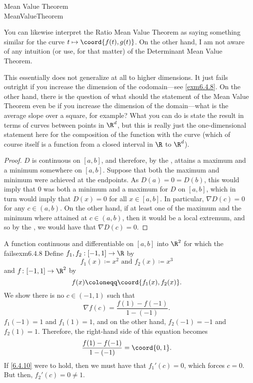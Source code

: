 \begin{thm}{Mean Value Theorem \\}{MeanValueTheorem}
\begin{rmk}
You can likewise interpret the Ratio Mean Value Theorem as saying something similar for the curve $t\mapsto \coord{f(t),g(t)}$.  On the other hand, I am not aware of any intuition (or use, for that matter) of the Determinant Mean Value Theorem.
\end{rmk}
\begin{rmk}
This essentially does not generalize at all to higher dimensions.  It just fails outright if you increase the dimension of the codomain---see \cref{exm6.4.8}.  On the other hand, there is the question of what should the statement of the Mean Value Theorem even be if you increase the dimension of the domain---what is the average slope over a square, for example?  What you can do is state the result in terms of curves between points in $\R ^d$, but this is really just the one-dimensional statement here for the composition of the function with the curve (which of course itself is a function from a closed interval in $\R$ to $\R ^d$).
\end{rmk}
\begin{proof}
$D$ is continuous on $[a,b]$, and therefore, by the , attains a maximum and a minimum somewhere on $[a,b]$.  Suppose that both the maximum and minimum were achieved at the endpoints.  As $D(a)=0=D(b)$, this would imply that $0$ was both a minimum and a maximum for $D$ on $[a,b]$, which in turn would imply that $D (x)=0$ for all $x\in [a,b]$.  In particular, $\nabla D(c)=0$ for any $c\in (a,b)$.  On the other hand, if at least one of the maximum and the minimum where attained at $c\in (a,b)$, then it would be a local extremum, and so by the , we would have that $\nabla D(c)=0$.
\end{proof}
\end{thm}

\begin{exm}{A function continuous and differentiable on ${[a,b]}$ into $\R ^2$ for which the  fails}{exm6.4.8}
Define $f_1,f_2:[-1,1]\rightarrow \R$ by
\begin{equation}
f_1(x)\coloneqq x^2\text{ and }f_2(x)\coloneqq x^3
\end{equation}
and $f\colon [-1,1]\rightarrow \R ^2$ by
\begin{equation}
f(x)\coloneqq \coord{f_1(x),f_2(x)}.
\end{equation}
We show there is no $c\in (-1,1)$ such that
\begin{equation}\label{6.4.10}
\nabla f(c)=\frac{f(1)-f(-1)}{1-(-1)}.
\end{equation}
$f_1(-1)=1$ and $f_1(1)=1$, and on the other hand, $f_2(-1)=-1$ and $f_2(1)=1$.  Therefore, the right-hand side of this equation becomes
\begin{equation}
\frac{f(1)-f(-1)}{1-(-1)}=\coord{0,1}.
\end{equation}
If \eqref{6.4.10} were to hold, then we must have that $f_1'(c)=0$, which forces $c=0$.  But then, $f_2'(c)=0\neq 1$.
\end{exm}


